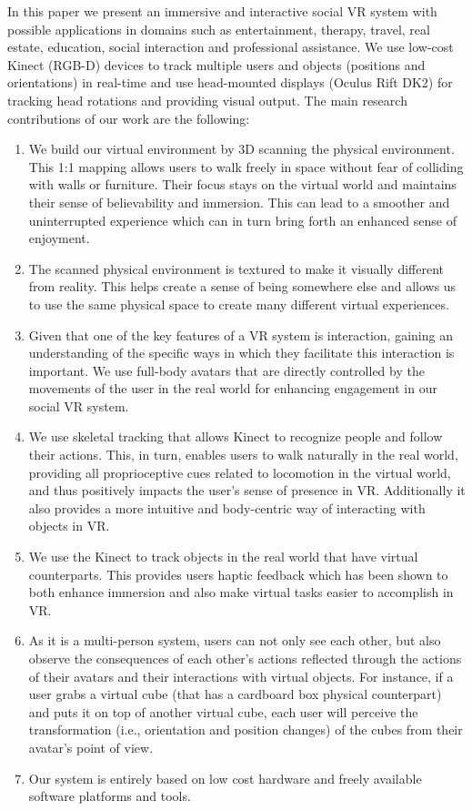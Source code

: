 \documentclass{sigchi}
\begin{document}
In this paper we present an immersive and interactive social VR system with possible applications in domains such as entertainment, therapy, travel, real estate, education, social interaction and professional assistance. We use low-cost Kinect (RGB-D) devices to track multiple users and objects (positions and orientations) in real-time and use head-mounted displays (Oculus Rift DK2) for tracking head rotations and providing visual output. The main research contributions of our work are the following:
\begin{enumerate}[label= --]\item We build our virtual environment by 3D scanning the physical environment. This 1:1 mapping allows users to walk freely in space without fear of colliding with walls or furniture. Their focus stays on the virtual world and maintains their sense of believability and immersion. This can lead to a smoother and uninterrupted experience which can in turn bring forth an enhanced sense of enjoyment.
\item The scanned physical environment is textured to make it visually different from reality. This helps create a sense of being somewhere else and allows us to use the same physical space to create many different virtual experiences.
\item Given that one of the key features of a VR system is interaction, gaining an understanding of the specific ways in which they facilitate this interaction is important. We use full-body avatars that are directly controlled by the movements of the user in the real world for enhancing engagement in our social VR system. 
\item We use skeletal tracking that allows Kinect to recognize people and follow their actions. This, in turn, enables users to walk naturally in the real world, providing all proprioceptive cues related to locomotion in the virtual world, and thus positively impacts the user's sense of presence in VR. Additionally it also provides a more intuitive and body-centric way of interacting with objects in VR.
\item We use the Kinect to track objects in the real world that have virtual counterparts. This provides users haptic feedback which has been shown to both enhance immersion and also make virtual tasks easier to accomplish in VR.
\item As it is a multi-person system, users can not only see each other, but also observe the consequences of each other's actions reflected through the actions of their avatars and their interactions with virtual objects. For instance, if a user grabs a virtual cube (that has a cardboard box physical counterpart) and puts it on top of another virtual cube, each user will perceive the transformation (i.e., orientation and position changes) of the cubes from their avatar's point of view. 
\item Our system is entirely based on low cost hardware and freely available software platforms and tools.  
\end{enumerate}
\end{document}
